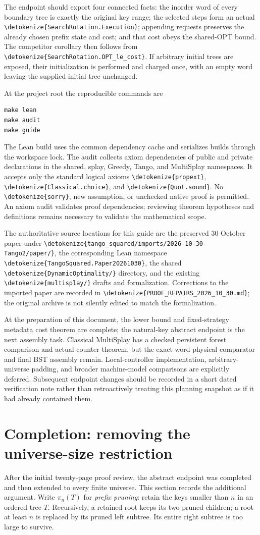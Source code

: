 \documentclass[11pt,a4paper]{article}
\newcommand{\lean}[1]{{\small\expandafter\nolinkurl\expandafter{\detokenize{#1}}}}
\newcommand{\nextpage}{\clearpage}
\begin{document}
The endpoint should export four connected facts: the inorder word of
every boundary tree is exactly the original key range; the selected
steps form an actual \lean{SearchRotation.Execution}; appending requests
preserves the already chosen prefix state and cost; and that cost obeys
the shared-OPT bound. The competitor corollary then follows from
\lean{SearchRotation.OPT_le_cost}. If arbitrary initial trees are exposed,
their initialization is performed and charged once, with an empty word
leaving the supplied initial tree unchanged.

At the project root the reproducible commands are
\begin{verbatim}
make lean
make audit
make guide
\end{verbatim}
The Lean build uses the common dependency cache and serializes builds
through the workspace lock. The audit collects axiom dependencies of
public and private declarations in the shared, splay, Greedy, Tango, and
MultiSplay namespaces. It accepts only the standard logical axioms
\lean{propext}, \lean{Classical.choice}, and \lean{Quot.sound}.
No \lean{sorry}, new assumption, or unchecked native proof is permitted.
An axiom audit validates proof dependencies; reviewing theorem hypotheses
and definitions remains necessary to validate the mathematical scope.

The authoritative source locations for this guide are the preserved
30 October paper under \lean{tango_squared/imports/2026-10-30-Tango2/paper/},
the corresponding Lean namespace \lean{TangoSquared.Paper20261030},
the shared \lean{DynamicOptimality/} directory, and the existing
\lean{multisplay/} drafts and formalization. Corrections to the imported
paper are recorded in \lean{PROOF_REPAIRS_2026_10_30.md}; the original
archive is not silently edited to match the formalization.

At the preparation of this document, the lower bound and fixed-strategy
metadata cost theorem are complete; the natural-key abstract endpoint
is the next assembly task. Classical MultiSplay has a checked persistent
forest comparison and actual counter theorem, but the exact-word physical
comparator and final BST assembly remain. Local-controller implementation,
arbitrary-universe padding, and broader machine-model comparisons are
explicitly deferred. Subsequent endpoint changes should be recorded in
a short dated verification note rather than retroactively treating this
planning snapshot as if it had already contained them.
\nextpage
\section{Completion: removing the universe-size restriction}\label{sec:padding}
After the initial twenty-page proof review, the abstract endpoint was
completed and then extended to every finite universe. This section records
the additional argument. Write $\pi_n(T)$ for \emph{prefix pruning}: retain
the keys smaller than $n$ in an ordered tree $T$. Recursively, a retained
root keeps its two pruned children; a root at least $n$ is replaced by
its pruned left subtree. Its entire right subtree is too large to survive.
\end{document}
